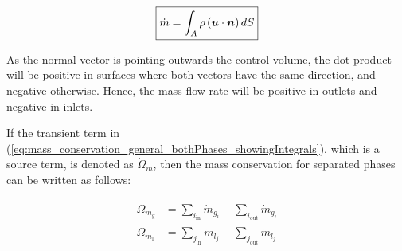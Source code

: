 \begin{equation}
\boxed{
\label{eq:mass_flow_rate_definition_general}
\dot{m} = \int_A \rho \left( \boldsymbol{u} \cdot \boldsymbol{n} \right) dS
}
\end{equation}

As the normal vector is pointing outwards the control volume, the dot product will be positive in surfaces where both vectors have the same direction, and negative otherwise. Hence, the mass flow rate will be positive in outlets and negative in inlets.

If the transient term in (\ref{eq:mass_conservation_general_bothPhases_showingIntegrals}), which is a source term, is denoted as $\dot{\Omega}_m$, then the mass conservation for separated phases can be written as follows:




\begin{subequations}
\label{eq:mass_conservation_general_bothPhases_transient}
\begin{align}
\dot{\Omega}_{m_\mathrm{g}} &= \sum_{i_\mathrm{in}} \dot{m}_{g_i} - \sum_{i_\mathrm{out}} \dot{m}_{g_i}  \\
\dot{\Omega}_{m_\mathrm{l}} &= \sum_{j_\mathrm{in}} \dot{m}_{l_j} - \sum_{j_\mathrm{out}} \dot{m}_{l_j}
\end{align}
\end{subequations}

